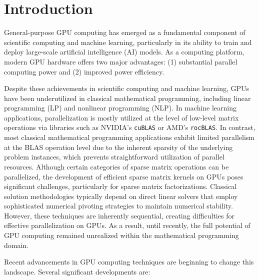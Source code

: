 \section{Introduction}
General-purpose GPU computing has emerged as a fundamental component of scientific computing and machine learning, particularly in its ability to train and deploy large-scale artificial intelligence (AI) models. As a computing platform, modern GPU hardware offers two major advantages: (1) substantial parallel computing power and (2) improved power efficiency.

Despite these achievements in scientific computing and machine learning, GPUs have been underutilized in classical mathematical programming, including linear programming (LP) and nonlinear programming (NLP). In machine learning applications, parallelization is mostly utilized at the level of low-level matrix operations via libraries such as NVIDIA's {\tt cuBLAS} or AMD's {\tt rocBLAS}. In contrast, most classical mathematical programming applications exhibit limited parallelism at the BLAS operation level due to the inherent sparsity of the underlying problem instances, which prevents straightforward utilization of parallel resources. Although certain categories of sparse matrix operations can be parallelized, the development of efficient sparse matrix kernels on GPUs poses significant challenges, particularly for sparse matrix factorizations. Classical solution methodologies typically depend on direct linear solvers that employ sophisticated numerical pivoting strategies to maintain numerical stability. However, these techniques are inherently sequential, creating difficulties for effective parallelization on GPUs. As a result, until recently, the full potential of GPU computing remained unrealized within the mathematical programming domain.

Recent advancements in GPU computing techniques are beginning to change this landscape. Several significant developments are:

